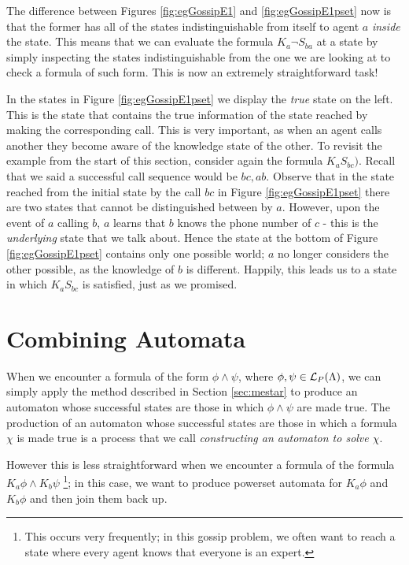 \documentclass[ %
                    author={Leo Poulson},
                supervisor={Dr. Steven Ramsay},
                    degree={BSc},
                     title={Epistemic Planning for the Dynamic Gossip problem},
                  subtitle={},
                      year={2019} ]{dissertation}
\begin{document}
The difference between Figures \ref{fig:egGossipE1} and \ref{fig:egGossipE1pset}
now is that the former has all of the states indistinguishable from itself to
agent $a$ \emph{inside} the state. This means that we can evaluate the formula
$K_a \neg S_{ba}$ at a state by simply inspecting the states indistinguishable
from the one we are looking at to check a formula of such form. This is now an
extremely straightforward task!

In the states in Figure \ref{fig:egGossipE1pset} we display the \emph{true} state on the left.
This is the state that contains the true information of the state reached by
making the corresponding call. This is very important, as when an agent calls
another they become aware of the knowledge state of the other. To revisit the
example from the start of this section, consider again the formula $K_a S_{bc})$.
Recall that we said a successful call sequence would be $bc, ab$. Observe that
in the state reached from the initial state by the call $bc$ in Figure
\ref{fig:egGossipE1pset} there are two states that cannot be distinguished
between by $a$. However, upon the event of $a$ calling $b$, $a$ learns that $b$
knows the phone number of $c$ - this is the \emph{underlying} state that we talk
about. Hence the state at the bottom of Figure \ref{fig:egGossipE1pset} contains
only one possible world; $a$ no longer considers the other possible, as the
knowledge of $b$ is different. Happily, this leads us to a state in which $K_a
S_{bc}$ is satisfied, just as we promised. 

\section{Combining Automata}

When we encounter a formula of the form $\phi \land \psi$, where $\phi, \psi \in
\mathcal{L}_P(\Lambda)$, we can simply apply the method described in Section
\ref{sec:mestar} to produce an automaton whose successful states are those in
which $\phi \land \psi$ are made true. The production of an automaton whose
successful states are those in which a formula $\chi$ is made true is a process
that we call \emph{constructing an automaton to solve $\chi$}.

However this is less straightforward when we encounter a formula of the formula
$K_a \phi \land K_b \psi$ \footnote{This occurs very frequently; in this gossip
  problem, we often want to reach a state where every agent knows that everyone
  is an expert.}; in this case, we want to produce powerset automata for $K_a
\phi$ and $K_b \phi$ and then join them back up.
\end{document}

